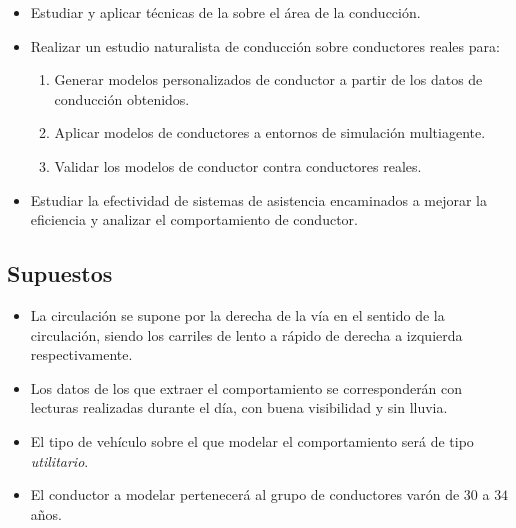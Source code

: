 \begin{itemize}
	\item Estudiar y aplicar técnicas de la  sobre el área de la conducción.
	\item Realizar un estudio naturalista de conducción sobre conductores reales para:
	\begin{enumerate}
		\item Generar modelos personalizados de conductor a partir de los datos de conducción obtenidos.
		\item Aplicar modelos de conductores a entornos de simulación multiagente.
		\item Validar los modelos de conductor contra conductores reales.
	\end{enumerate}
	\item Estudiar la efectividad de sistemas de asistencia encaminados a mejorar la eficiencia y analizar el comportamiento de conductor.
\end{itemize}

\subsection{Supuestos}

\begin{itemize}
	\item La circulación se supone por la derecha de la vía en el sentido de la circulación, siendo los carriles de lento a rápido de derecha a izquierda respectivamente.
	\item Los datos de los que extraer el comportamiento se corresponderán con lecturas realizadas durante el día, con buena visibilidad y sin lluvia.
	\item El tipo de vehículo sobre el que modelar el comportamiento será de tipo \textit{utilitario}.
	\item El conductor a modelar pertenecerá al grupo de conductores varón de $30$ a $34$ años.
\end{itemize}

